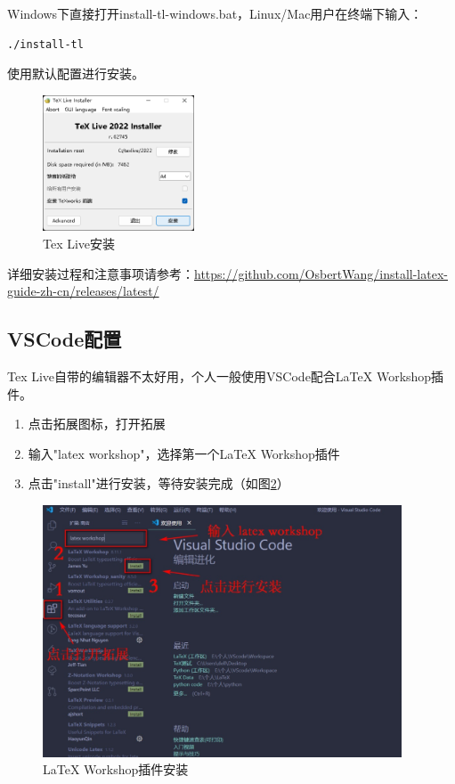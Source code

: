 Windows下直接打开install-tl-windows.bat，Linux/Mac用户在终端下输入：

\begin{lstlisting}[language=bash]
  ./install-tl
\end{lstlisting}

使用默认配置进行安装。

\begin{figure}[htb]
  \centering
  \includegraphics[width=0.4\textwidth]{figures/chapter2/texlive-install.png}
  \caption{Tex Live安装}
  \label{fig:2-texlive-install}
\end{figure}

详细安装过程和注意事项请参考：\url{https://github.com/OsbertWang/install-latex-guide-zh-cn/releases/latest/}

\subsection{VSCode配置}

Tex Live自带的编辑器不太好用，个人一般使用VSCode配合LaTeX Workshop插件。

\begin{enumerate}
  \item 点击拓展图标，打开拓展
  \item 输入"latex workshop"，选择第一个LaTeX Workshop插件
  \item 点击"install"进行安装，等待安装完成（如图\ref{fig:2-plugin-install}）
\end{enumerate}

\begin{figure}[H]
  \centering
  \includegraphics[width=0.95\textwidth]{figures/chapter2/plugin-install.png}
  \caption{LaTeX Workshop插件安装}
  \label{fig:2-plugin-install}
\end{figure}

